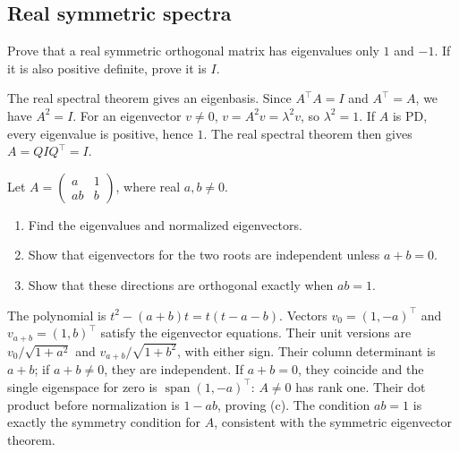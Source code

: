 \subsection*{Real symmetric spectra}

\begin{problem}\label{ex:09:symmetric-orthogonal}
Prove that a real symmetric orthogonal matrix has eigenvalues only
\(1\) and \(-1\). If it is also positive definite, prove it is \(I\).
\end{problem}
\begin{solution}
The real spectral theorem gives an eigenbasis. Since \(A^\top A=I\)
and \(A^\top=A\), we have \(A^2=I\). For an eigenvector \(v\ne0\),
\(v=A^2v=\lambda^2v\), so \(\lambda^2=1\).
If \(A\) is PD, every eigenvalue is positive, hence \(1\).
The real spectral theorem then gives \(A=QI Q^\top=I\).
\end{solution}

\begin{problem}\label{ex:09:parameters}
Let \(A=\begin{pmatrix}a&1\\ab&b\end{pmatrix}\), where real \(a,b\ne0\).
\begin{enumerate}
\item Find the eigenvalues and normalized eigenvectors.
\item Show that eigenvectors for the two roots are independent unless
\(a+b=0\).
\item Show that these directions are orthogonal exactly when \(ab=1\).
\end{enumerate}
\end{problem}
\begin{solution}
The polynomial is \(t^2-(a+b)t=t(t-a-b)\).
Vectors \(v_0=(1,-a)^\top\) and \(v_{a+b}=(1,b)^\top\) satisfy
the eigenvector equations. Their unit versions are
\(v_0/\sqrt{1+a^2}\) and \(v_{a+b}/\sqrt{1+b^2}\), with either sign.
Their column determinant is \(a+b\); if \(a+b\ne0\), they are independent.
If \(a+b=0\), they coincide and the single eigenspace for zero is
\(\operatorname{span}(1,-a)^\top\): \(A\ne0\) has rank one.
Their dot product before normalization is \(1-ab\), proving (c).
The condition \(ab=1\) is exactly the symmetry condition for \(A\),
consistent with the symmetric eigenvector theorem.
\end{solution}

